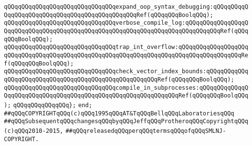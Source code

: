 \verb|qQQqqQQqqQQqqQQqqQQqqQQqqQQqqQQqexpand_oop_syntax_debugging:qQQqqQQqqQQqqQQqqQQqqQQqqQQqqQQqqQQqqQQqqQQqqQQqRef(qQQqqQQqBoolqQQq);|\newline
\newline
\verb|qQQqqQQqqQQqqQQqqQQqqQQqqQQqqQQqverbose_compile_log:qQQqqQQqqQQqqQQqqQQqqQQqqQQqqQQqqQQqqQQqqQQqqQQqqQQqqQQqqQQqqQQqqQQqqQQqqQQqqQQqRef(qQQqqQQqBoolqQQq);|\newline
\verb|qQQqqQQqqQQqqQQqqQQqqQQqqQQqqQQqtrap_int_overflow:qQQqqQQqqQQqqQQqqQQqqQQqqQQqqQQqqQQqqQQqqQQqqQQqqQQqqQQqqQQqqQQqqQQqqQQqqQQqqQQqqQQqqQQqRef(qQQqqQQqBoolqQQq);|\newline
\verb|qQQqqQQqqQQqqQQqqQQqqQQqqQQqqQQqcheck_vector_index_bounds:qQQqqQQqqQQqqQQqqQQqqQQqqQQqqQQqqQQqqQQqqQQqqQQqqQQqqQQqRef(qQQqqQQqBoolqQQq);|\newline
\verb|qQQqqQQqqQQqqQQqqQQqqQQqqQQqqQQqcompile_in_subprocesses:qQQqqQQqqQQqqQQqqQQqqQQqqQQqqQQqqQQqqQQqqQQqqQQqqQQqqQQqqQQqqQQqRef(qQQqqQQqBoolqQQq);|\newline
\verb|qQQqqQQqqQQqqQQq};|\newline
\verb|end;|\newline
\newline
\verb|##qQQqCOPYRIGHTqQQq(c)qQQq1995qQQqAT&TqQQqBellqQQqLaboratoriesqQQq|\newline
\verb|##qQQqSubsequentqQQqchangesqQQqbyqQQqJeffqQQqProtheroqQQqCopyrightqQQq(c)qQQq2010-2015,|\newline
\verb|##qQQqreleasedqQQqperqQQqtermsqQQqofqQQqSMLNJ-COPYRIGHT.|\newline

